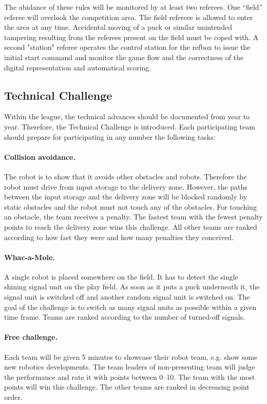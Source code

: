 \documentclass[12pt,twoside]{article}
\newenvironment{rulechange}{}{}
\begin{document}
The abidance of these rules will be monitored by at least two
referees.  One ``field'' referee will overlook the competition
area. The field refereee is allowed to enter the area at any
time. Accidental moving of a puck or similar unintended tampering
resulting from the referees present on the field must be coped with. A
second "station" referee operates the control station for the refbox
to issue the initial start command and monitor the game flow and the
correctness of the digital representation and automatical scoring.

\begin{rulechange}
  \subsection{Technical Challenge}
  
  Within the league, the technical advances should be documented from
  year to year. Therefore, the Technical Challenge is introduced.
  Each participating team should prepare for participating in any
  number the following tasks:


  \paragraph{Collision avoidance.~}
  The robot is to show that it avoids other obstacles and robots.
  Therefore the robot must drive from input storage to the delivery zone.
  However, the paths between the input storage and the delivery zone will
  be blocked randomly by static obstacles and the robot must not touch any
  of the obstacles. For touching an obstacle, the team receives a penalty.
  The fastest team with the fewest penalty points to reach the delivery
  zone wins this challenge. All other teams are ranked according to
  how fast they were and how many penalties they conceived.
  
  \paragraph{Whac-a-Mole.~}
  A single robot is placed somewhere on the field. It has to detect
  the single shining signal unit on the play field. As soon as it puts
  a puck underneath it, the signal unit is switched off and another
  random signal unit is switched on. The goal of the challenge is to
  switch as many signal units as possible within a given time
  frame. Teams are ranked according to the number of turned-off
  signals.
  
  \paragraph{Free challenge.~}
  Each team will be given 5 minutes to showcase their robot team, e.g.
  show some new robotics developments. The team leaders of
  non-presenting team will judge the performance and rate it with
  points between 0--10.  The team with the most points will win this
  challenge. The other teams are ranked in decreasing point order.



\end{rulechange}
\end{document}

